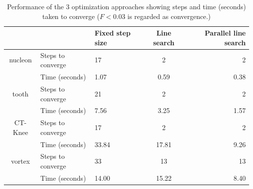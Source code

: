 
\begin{table}[h]
	\begin{tabular}{ c | l | l c r }
		& & Fixed step size & Line search & Parallel line search \\
		\hline
		nucleon & Steps to converge & 17 & 2 & 2 \\
		& Time (seconds) & 1.07 & 0.59 & 0.38 \\
		\hline
		tooth & Steps to converge & 21 & 2 & 2 \\
		& Time (seconds) & 7.56 & 3.25 & 1.57 \\
		\hline
		CT-Knee & Steps to converge & 17 & 2 & 2 \\
		& Time (seconds) & 33.84 & 17.81 & 9.26 \\
		\hline
		vortex & Steps to converge & 33 & 13 & 13 \\
		& Time (seconds) & 14.00 & 15.22 & 8.40 \\
	\end{tabular}
	\caption[Performance of the 3 optimization approaches]{Performance of the 3 optimization approaches showing steps and time (seconds) taken to converge ($ F<0.03 $ is regarded as convergence.)}
	\label{table:performance_table}
\end{table}


